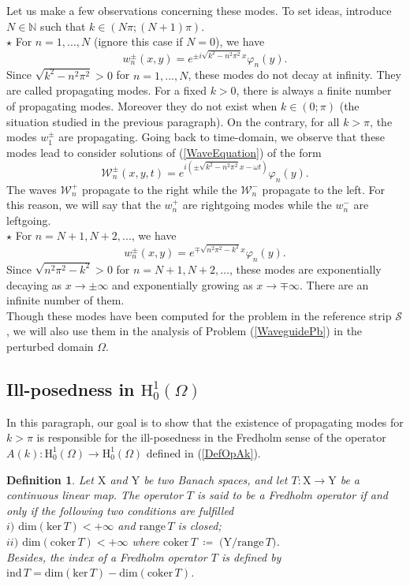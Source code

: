\documentclass[11pt,a4paper]{report}
\newcommand{\dsp}{\displaystyle}
\newcommand{\om}{\omega}
\newcommand{\Om}{\Omega}
\newcommand{\mrm}[1]{\mathrm{#1}}
\newcommand{\N}{\mathbb{N}}
\newcommand{\mH}{\mrm{H}}
\newtheorem{definition}[theorem]{Definition}
\begin{document}
\newline
Let us make a few observations concerning these modes. To set ideas, introduce $N\in\N$ such that $k\in(N\pi;(N+1)\pi)$.\\[4pt]
$\star$ For $n=1,...,N$ (ignore this case if $N=0$), we have
\[
w_n^\pm(x,y)=e^{\pm i\sqrt{k^2-n^2\pi^2}x}\varphi_n(y).
\] 
Since $\sqrt{k^2-n^2\pi^2}>0$ for $n=1,...,N$, these modes do not decay at infinity. They are called propagating modes. For a fixed $k>0$, there is always a finite number of propagating modes. Moreover they do not exist when $k\in(0;\pi)$ (the situation studied in the previous paragraph). On the contrary, for all $k>\pi$, the modes $w_1^\pm$ are propagating. Going back to time-domain, we observe that these modes lead to consider solutions of (\ref{WaveEquation}) of the form
\[
\mathcal{W}_n^\pm(x,y,t)=e^{i(\pm \sqrt{k^2-n^2\pi^2}x-\om t)}\varphi_n(y).
\]
The waves $\mathcal{W}_n^+$ propagate to the right while the $\mathcal{W}_n^-$ propagate to the left. For this reason, we will say that the $w_n^+$ are rightgoing modes while the $w_n^-$ are leftgoing.\\[4pt]
$\star$ For $n=N+1,N+2,...$, we have
\[
w_n^\pm(x,y)=e^{\mp \sqrt{n^2\pi^2-k^2}x}\varphi_n(y).
\] 
Since $\sqrt{n^2\pi^2-k^2}>0$ for $n=N+1,N+2,\dots$, these modes  are exponentially decaying as $x\to\pm\infty$ and exponentially growing as $x\to\mp\infty$. There are an infinite number of them.\\
\newline
Though these modes have been computed for the problem in the reference strip $\mathcal{S}$, we will also use them in the analysis of Problem (\ref{WaveguidePb}) in the perturbed domain $\Om$.

\subsection{Ill-posedness in $\mH^1_0(\Om)$}

In this paragraph, our goal is to show that the existence of propagating modes for $k>\pi$ is responsible for the ill-posedness in the Fredholm sense of the operator 
$A(k):\mH^1_0(\Om)\to\mH^1_0(\Om)$ defined in (\ref{DefOpAk}). 


\begin{definition}\label{definition fredholm op}
Let $\mrm{X}$ and $\mrm{Y}$ be two Banach spaces, and let
$T: \mrm{X}\to \mrm{Y}$ be a continuous linear map.
The operator $T$ is said to be a Fredholm operator if and 
only if the following two conditions are fulfilled\\[6pt]
$i)$  $\mrm{dim}(\mrm{ker}\,T ) <+\infty$ and $\mrm{range}\, T$ is closed;\\[6pt]
$ii)$ $\mrm{dim}(\mrm{coker}\,T ) <+\infty$ where $\mrm{coker}\,T  
\;\dsp{ \coloneqq\; \big(\mrm{Y}/\mrm{range}\, T\big) }$.\\[6pt]
Besides, the index of a Fredholm operator $T$ 
is defined by $\mrm{ind}\,T = \mrm{dim}(\mrm{ker}\,T ) - 
\mrm{dim}(\mrm{coker}\,T)$.
\end{definition}
\end{document}
